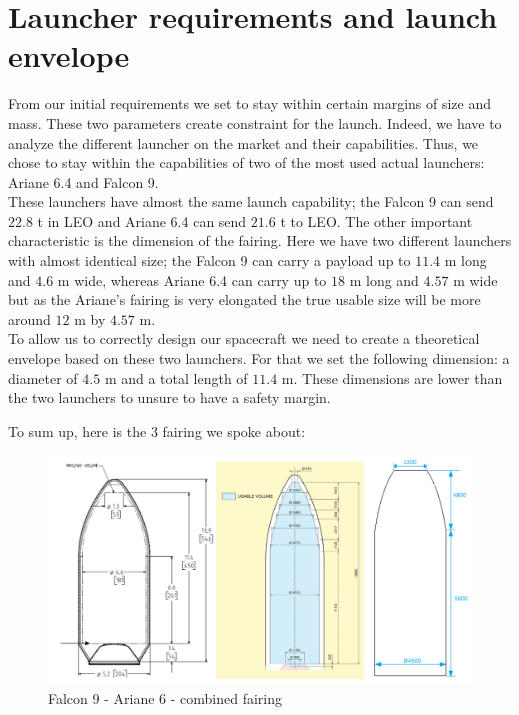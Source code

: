 \chapter{Launcher requirements and launch envelope}

From our initial requirements we set to stay within certain margins of size and mass. These two parameters create constraint for the launch. 
Indeed, we have to analyze the different launcher on the market and their capabilities. 
Thus, we chose to stay within the capabilities of two of the most used actual launchers: Ariane 6.4 and Falcon 9. \\

These launchers have almost the same launch capability; the Falcon 9 can send $22.8$ t in LEO and Ariane 6.4 can send $21.6$ t to LEO.
The other important characteristic is the dimension of the fairing.
Here we have two different launchers with almost identical size; the Falcon 9 can carry a payload up to $11.4$ m long and $4.6$ m wide, whereas Ariane 6.4 can carry up to $18$ m long and $4.57$ m wide but as the Ariane's fairing is very elongated the true usable size will be more around $12$ m by $4.57$ m. \\

To allow us to correctly design our spacecraft we need to create a theoretical envelope based on these two launchers. For that we set the following dimension: a diameter of $4.5$ m and a total length of $11.4$ m. These dimensions are lower than the two launchers to unsure to have a safety margin.

\clearpage

To sum up, here is the 3 fairing we spoke about:

\begin{figure}[H]
    \centering
    \includegraphics[width=\linewidth]{enveloppe}
    \caption{Falcon 9 - Ariane 6 - combined fairing}
    \label{fig:my_label}
\end{figure}

